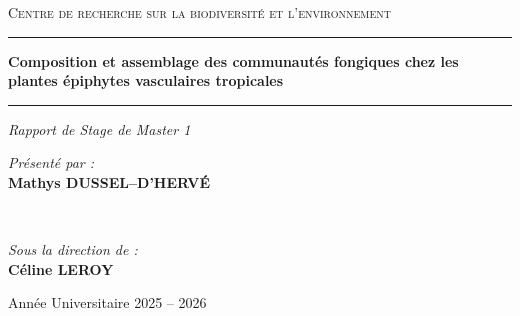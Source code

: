 \documentclass[11pt, a4paper]{article}
\newcommand{\monTitre}{Composition et assemblage des communautés fongiques chez les plantes épiphytes vasculaires tropicales}
\newcommand{\monNom}{Mathys DUSSEL--D'HERVÉ}
\newcommand{\monLabo}{Centre de recherche sur la biodiversité et l'environnement}
\begin{document}
\begin{titlepage}
  \centering
  \vspace*{1.5cm}
  
  
  \vspace{3cm}
  
  {\large \textsc{\monLabo} \par}
  
  \vspace{2.5cm}
  
  \rule{\linewidth}{1.5pt} \par
  \vspace{0.8cm}
  {\Huge \bfseries \color{naturegreen} \monTitre \par}
  \vspace{0.8cm}
  \rule{\linewidth}{1.5pt} \par
  
  \vspace{1.5cm}
  
  {\Large \textit{Rapport de Stage de Master 1}}
  
  \vspace{3cm} %
  
  \begin{minipage}{0.45\textwidth}
    \begin{flushleft} \large
      \emph{Présenté par :}\\
      \textbf{\monNom}
    \end{flushleft}
  \end{minipage}
  ~
  \begin{minipage}{0.45\textwidth}
    \begin{flushright} \large
      \emph{Sous la direction de :}\\
      \textbf{Céline LEROY} \\
    \end{flushright}
  \end{minipage}
  
  \vfill
  
  {\large Année Universitaire 2025 -- 2026 \par}
  \vspace*{1cm}
\end{titlepage}
\end{document}
